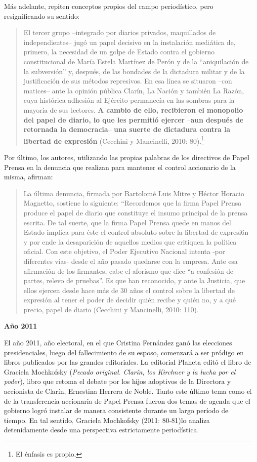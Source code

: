 Más adelante, repiten conceptos propios del campo periodístico, pero resignificando su sentido:

\begin{quote}
El tercer grupo --integrado por diarios privados, maquillados de independientes-- jugó un papel decisivo en la instalación mediática de, primero, la necesidad de un golpe de Estado contra el gobierno constitucional de María Estela Martínez de Perón y de la ``aniquilación de la subversión'' y, después, de las bondades de la dictadura militar y de la justificación de sus métodos represivos. En esa línea se situaron --con matices-- ante la opinión pública Clarín, La Nación y también La Razón, cuya histórica adhesión al Ejército permanecía en las sombras para la mayoría de sus lectores. \textbf{A cambio de ello, recibieron el monopolio del papel de diario, lo que les permitió ejercer} --\textbf{aun después de retornada la democracia}-- \textbf{una suerte de dictadura contra la libertad de expresión} (Cecchini y Mancinelli, 2010: 80).\footnote{El énfasis es propio.}
\end{quote}

Por último, los autores, utilizando las propias palabras de los directivos de Papel Prensa en la denuncia que realizan para mantener el control accionario de la misma, afirman:

\begin{quote}
La última denuncia, firmada por Bartolomé Luis Mitre y Héctor Horacio Magnetto, sostiene lo siguiente: ``Recordemos que la firma Papel Prensa produce el papel de diario que constituye el insumo principal de la prensa escrita. De tal suerte, que la firma Papel Prensa quede en manos del Estado implica para éste el control absoluto sobre la libertad de expresi6n y por ende la desaparición de aquellos medios que critiquen la política oficial. Con este objetivo, el Poder Ejecutivo Nacional intenta -por diferentes vías- desde el año pasado quedarse con la empresa. Ante esa afirmación de los firmantes, cabe el aforismo que dice ``a confesión de partes, relevo de pruebas''. Es que han reconocido, y ante la Justicia, que ellos ejercen desde hace más de 30 años el control sobre la libertad de expresión al tener el poder de decidir quién recibe y quién no, y a qué precio, papel de diario (Cecchini y Mancinelli, 2010: 110).
\end{quote}

\textbf{Año 2011}

El año 2011, año electoral, en el que Cristina Fernández ganó las elecciones presidenciales, luego del fallecimiento de su esposo, comenzará a ser pródigo en libros publicados por las grandes editoriales. La editorial Planeta editó el libro de Graciela Mochkofsky (\emph{Pecado original. Clarín, los Kirchner y la lucha por el poder}), libro que retoma el debate por los hijos adoptivos de la Directora y accionista de Clarín, Ernestina Herrera de Noble. Tanto este último tema como el de la transferencia accionaria de Papel Prensa fueron dos temas de agenda que el gobierno logró instalar de manera consistente durante un largo período de tiempo. En tal sentido, Graciela Mochkofsky (2011: 80-81)lo analiza detenidamente desde una perspectiva estrictamente periodística.

